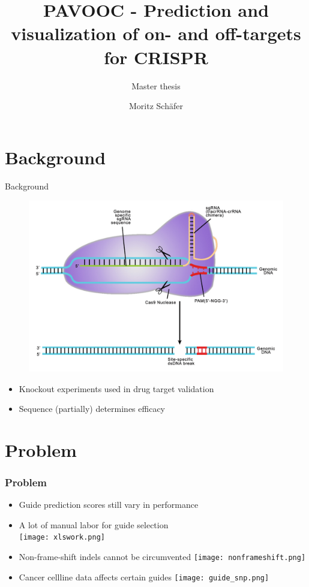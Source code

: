 \documentclass[Nike]{tuberlinbeamer}
\title{PAVOOC - Prediction and visualization of on- and off-targets for CRISPR}
\subtitle{Master thesis}
\author[Moritz Schäfer]{Moritz Schäfer}
\institute{Technische Universität Berlin \& Bayer Pharma}
\begin{document}
\begin{frame}
\maketitle
\end{frame}



\section{Background}
\begin{frame}{Background}
  \begin{figure}
    \hspace*{0.2in}
    \includegraphics[width=0.57\linewidth,left]{Doudna-art-crop.jpg}
  \end{figure}
  \begin{itemize}
    \item Knockout experiments used in drug target validation
    \item Sequence (partially) determines efficacy
  \end{itemize}
\end{frame}

\section{Problem}

\begin{frame}
  \frametitle{Problem}
  \begin{itemize}
    \item Guide prediction scores still vary in performance
    \pause
    \item A lot of manual labor for guide selection \\
      \texttt{[image: xlswork.png]}
    \pause
    \item Non-frame-shift indels cannot be circumvented
      \texttt{[image: nonframeshift.png]}
    \pause
    \item Cancer cellline data affects certain guides
      \texttt{[image: guide\_snp.png]}
  \end{itemize}
\end{frame}
\end{document}

